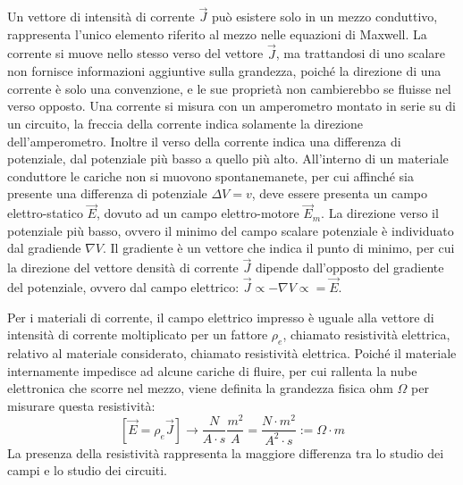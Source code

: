 \documentclass{article}
\numberwithin{equation}{subsection}
\begin{document}
Un vettore di intensità di corrente $\vec{J}$ può esistere solo in un mezzo conduttivo, rappresenta l'unico elemento riferito al mezzo nelle equazioni di Maxwell. La corrente 
si muove nello stesso verso del vettore $\vec{J}$, ma trattandosi di uno scalare non fornisce informazioni aggiuntive sulla grandezza, poiché la direzione di una corrente è 
solo una convenzione, e le sue proprietà non cambierebbo se fluisse nel verso opposto. Una corrente si misura con un amperometro montato in serie su di un circuito, la freccia 
della corrente indica solamente la direzione dell'amperometro. Inoltre il verso della corrente indica una differenza di potenziale, dal potenziale più basso a quello 
più alto. All'interno di un materiale conduttore le cariche non si muovono spontanemanete, per cui affinché sia presente una differenza di potenziale $\Delta V=v$, deve essere 
presenta un campo elettro-statico $\vec{E}$, dovuto ad un campo elettro-motore $\vec{E}_m$. La direzione verso il potenziale più basso, ovvero il minimo del campo scalare 
potenziale è individuato dal gradiende $\nabla V$. Il gradiente è un vettore che indica il punto di minimo, per cui la direzione del vettore densità di corrente $\vec{J}$ 
dipende dall'opposto del gradiente del potenziale, ovvero dal campo elettrico: $\vec{J}\propto-\nabla V\propto=\vec{E}$. 

\begin{center}
\end{center}

Per i materiali di corrente, il campo elettrico impresso è uguale alla vettore di intensità di corrente moltiplicato per un fattore $\rho_e$, chiamato resistività elettrica, 
relativo al materiale considerato, chiamato resistività elettrica. Poiché il materiale internamente impedisce ad alcune cariche di fluire, per cui rallenta la nube elettronica 
che scorre nel mezzo, viene definita la grandezza fisica ohm $\Omega$ per misurare questa resistività:
\begin{equation*}
    \displaystyle\left[\vec{E}=\rho_{e}\vec{J}\right]\to\frac{N}{A\cdot s}\frac{m^2}{A}=\frac{N\cdot m^2}{A^2\cdot s}:=\Omega\cdot m
\end{equation*}
La presenza della resistività rappresenta la maggiore differenza tra lo studio dei campi e lo studio dei circuiti.  
\end{document}

